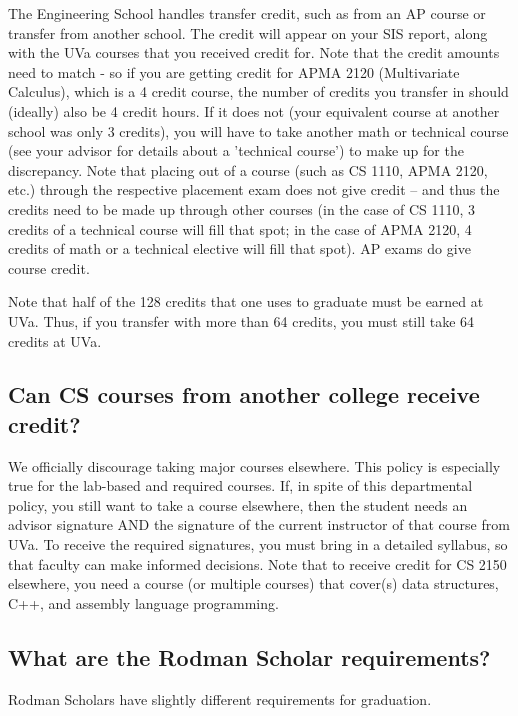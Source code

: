 \documentclass[10pt,letter]{book}
\begin{document}
The Engineering School handles transfer credit, such as from an AP
course or transfer from another school. The credit will appear on your
SIS report, along with the UVa courses that you received credit
for. Note that the credit amounts need to match - so if you are
getting credit for APMA 2120 (Multivariate Calculus), which is a
4 credit course, the number of credits you transfer in should
(ideally) also be 4 credit hours. If it does not (your equivalent
course at another school was only 3 credits), you will have to take
another math or technical course (see your advisor for details about a
'technical course') to make up for the discrepancy. Note that placing
out of a course (such as CS 1110, APMA 2120, etc.) through
the respective placement exam does not give credit – and thus the
credits need to be made up through other courses (in the case of CS
1110, 3 credits of a technical course will fill that spot; in
the case of APMA 2120, 4 credits of math or a technical elective
will fill that spot). AP exams do give course credit.

Note that half of the 128 credits that one uses to graduate must be
earned at UVa. Thus, if you transfer with more than 64 credits, you
must still take 64 credits at UVa.

\subsection{Can CS courses from another college receive credit?}

We officially discourage taking major courses elsewhere. This policy
is especially true for the lab-based and required courses. If, in
spite of this departmental policy, you still want to take a course
elsewhere, then the student needs an advisor signature AND the
signature of the current instructor of that course from UVa. To
receive the required signatures, you must bring in a detailed
syllabus, so that faculty can make informed decisions. Note that to
receive credit for CS 2150 elsewhere, you need a course (or
multiple courses) that cover(s) data structures, C++, and assembly
language programming.

\subsection{What are the Rodman Scholar requirements?}

Rodman Scholars have slightly different requirements for graduation.
\end{document}
